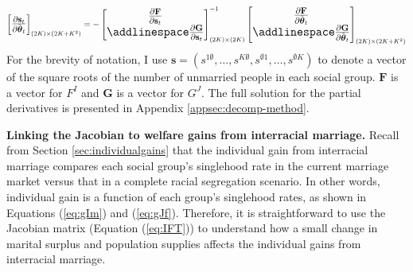 \begin{align}
\begin{Large}
	\begin{bmatrix}
		 \frac{\partial \mathbf{s}_t }{\partial \tilde{\boldsymbol{\theta}}_t}
	\end{bmatrix}_{(2K) \times (2K+K^2)}
	= - 
	\begin{bmatrix}
		\frac{\partial \mathbf{F}}{\partial  \mathbf{s}_t } \\ \addlinespace 
		\frac{\partial \mathbf{G}}{\partial  \mathbf{s}_t } 
	\end{bmatrix}^{-1}_{(2K)\times (2K)}
	\begin{bmatrix}
		\frac{\partial \mathbf{F}}{\partial \tilde{\boldsymbol{\theta}}_t } \\ \addlinespace 
		\frac{\partial \mathbf{G}}{\partial \tilde{\boldsymbol{\theta}}_t}
	\end{bmatrix}_{(2K) \times (2K+K^2)} 
	\end{Large} \label{eq:IFT}
\end{align}
For the brevity of notation, I use $\mathbf{s} = ( s^{1\emptyset}, \ldots, s^{K\emptyset}, s^{\emptyset 1}, \ldots, s^{\emptyset K} )$ to denote a vector of the square roots of the number of unmarried people in each social group. $\mathbf{F}$ is a vector for $F^I$ and $\mathbf{G}$ is a vector for $G^J$. The full solution for the partial derivatives is presented in Appendix \ref{appsec:decomp-method}. 

\vspace{3mm}
\noindent \textbf{Linking the Jacobian to welfare gains from interracial marriage.} Recall from Section \ref{sec:individualgains} that the individual gain from interracial marriage compares each social group's singlehood rate in the current marriage market versus that in a complete racial segregation scenario. In other words, individual gain is a function of each group's singlehood rates, as shown in Equations (\ref{eq:gIm}) and (\ref{eq:gJf}). Therefore, it is straightforward to use the Jacobian matrix (Equation (\ref{eq:IFT})) to understand how a small change in
marital surplus and population supplies affects the individual gains from interracial marriage. 

